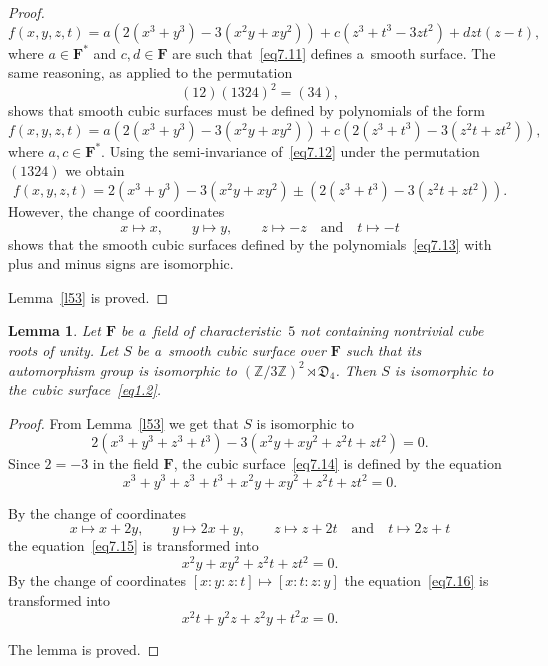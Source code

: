 \documentclass{amsart}
\numberwithin{equation}{section}
\theoremstyle{plain}
\newtheorem{lemma}{Lemma}
\theoremstyle{definition}
\theoremstyle{remark}
\begin{document}
\begin{proof}
\begin{equation}
\label{eq7.11}
f(x,y,z,t)=a(2(x^3+y^3)-3(x^2y+xy^2))+c(z^3+t^3-3zt^2)+dzt(z-t),
\end{equation}
where $a \in \mathbf{F}^*$ and $c,d \in \mathbf{F}$ are such that~\eqref{eq7.11} defines a~smooth surface. The same reasoning, as applied to the permutation
$$
(12)(1324)^2=(34),
$$
shows that smooth cubic surfaces must be defined by polynomials of the form
\begin{equation}
\label{eq7.12}
f(x,y,z,t)=a(2(x^3+y^3)-3(x^2y+xy^2))+c(2(z^3+t^3)-3(z^2t+zt^2)),
\end{equation}
where $a,c \in \mathbf{F}^*$. Using the semi-invariance of~\eqref{eq7.12} under the permutation $(1324)$ we obtain
\begin{equation}
\label{eq7.13}
f(x,y,z,t)=2(x^3+y^3)- 3(x^2y+xy^2)\pm (2(z^3+t^3)-3(z^2t+zt^2)).
\end{equation}
However, the change of coordinates
$$
x \mapsto x, \qquad y \mapsto y, \qquad z \mapsto -z \quad\text{and}\quad t \mapsto -t
$$
shows that the smooth cubic surfaces defined by the polynomials~\eqref{eq7.13} with plus and minus signs are isomorphic.

Lemma~\ref{l53} is proved.
\end{proof}

\begin{lemma}
\label{l54}
Let $\mathbf{F}$ be a~field of characteristic~$5$ not containing nontrivial cube roots of unity. Let $S$ be a~smooth cubic surface over $\mathbf{F}$ such that its automorphism group is isomorphic to $(\mathbb{Z}/3\mathbb{Z})^2 \rtimes \mathfrak{D}_4$. Then $S$ is isomorphic to the cubic surface~\eqref{eq1.2}.
\end{lemma}

\begin{proof}
From Lemma~\ref{l53} we get that $S$ is isomorphic to
\begin{equation}
\label{eq7.14}
2(x^3+y^3+z^3+t^3)-3(x^2y+xy^2+z^2t+zt^2)=0.
\end{equation}
Since $2=-3$ in the field $\mathbf{F}$, the cubic surface~\eqref{eq7.14} is defined by the equation
\begin{equation}
\label{eq7.15}
x^3+y^3+z^3+t^3+x^2y+xy^2+z^2t+zt^2=0.
\end{equation}

By the change of coordinates
$$
x \mapsto x+ 2y, \qquad y \mapsto 2x+ y, \qquad z \mapsto z+ 2t \quad\text{and}\quad t \mapsto 2z+ t
$$
the equation~\eqref{eq7.15} is transformed into
\begin{equation}
\label{eq7.16}
x^2y+xy^2+z^2t+zt^2=0.
\end{equation}
By the change of coordinates $[x:y:z:t] \mapsto [x:t:z:y]$ the equation~\eqref{eq7.16} is transformed into
$$
 x^2t+y^2z+z^2y+t^2x=0.
$$

The lemma is proved.
\end{proof}
\end{document}
